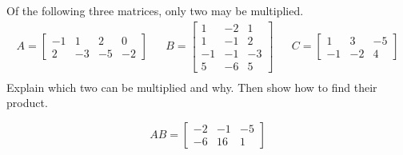
\begin{exerciseStatement}


Of the following three matrices, only two may be multiplied. 
\begin{align*} A= \left[\begin{array}{cccc}
-1 & 1 & 2 & 0 \\
2 & -3 & -5 & -2
\end{array}\right]  & & B= \left[\begin{array}{ccc}
1 & -2 & 1 \\
1 & -1 & 2 \\
-1 & -1 & -3 \\
5 & -6 & 5
\end{array}\right]  & & C= \left[\begin{array}{ccc}
1 & 3 & -5 \\
-1 & -2 & 4
\end{array}\right]  \\ \end{align*}
             Explain which two can be multiplied and why. Then show how to find their product.


\end{exerciseStatement}
    
\begin{exerciseAnswer} 
\[AB= \left[\begin{array}{ccc}
-2 & -1 & -5 \\
-6 & 16 & 1
\end{array}\right] \]
\end{exerciseAnswer}
    
